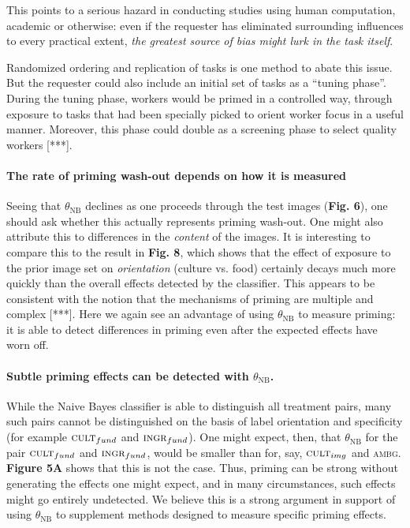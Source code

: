 \documentclass[a4paper]{report}
\begin{document}
This points to a serious hazard in conducting studies using human computation,
academic or otherwise: even if the requester has 
eliminated surrounding influences to every practical extent, 
\textit{the greatest source of bias might lurk in the task itself}.

Randomized ordering and replication of tasks is one method to abate this issue.
But the requester could also include an initial set of tasks as a 
``tuning phase''.  During the tuning phase, workers would be primed in a 
controlled way, through exposure to tasks that had been specially picked to
orient worker focus in a useful manner.  Moreover, this phase could double as a
screening phase to select quality workers [***].

\paragraph{The rate of priming wash-out depends on how it is measured}
Seeing that $\theta_\text{NB}$ declines as one proceeds through the test 
images (\textbf{Fig. 6}), one should ask whether this actually represents 
priming wash-out.  One might also attribute this to 
differences in the \textit{content} of the images. It is interesting to 
compare this to the result in \textbf{Fig. 8}, which
shows that the effect of exposure to the prior image set on 
\textit{orientation} (culture vs. food) certainly
decays much more quickly than the overall effects detected by
the classifier.  This appears to be consistent with the notion that the 
mechanisms of priming are multiple and complex [***].  Here we again see an
advantage of using $\theta_\text{NB}$ to measure priming: it is able to detect 
differences in priming even after the expected effects have worn off.

\paragraph{Subtle priming effects can be detected with $\theta_\text{NB}$.}
While the Naive Bayes classifier is able to distinguish all treatment pairs,
many such pairs cannot be distinguished on the basis of label orientation and 
specificity 
(for example $\textsc{cult}_{fund}$ and $\textsc{ingr}_{fund}$).
One might expect, then, that $\theta_\text{NB}$
for the pair $\textsc{cult}_{fund}$ and $\textsc{ingr}_{fund}$, would be 
smaller than for, say, $\textsc{cult}_{img}$ and \textsc{ambg}.  
\textbf{Figure 5A} shows that this is not the case.  Thus, priming can be 
strong without generating the effects one might expect, and in many 
circumstances, such effects might go entirely undetected.  We believe this 
is a strong argument in support of using $\theta_\text{NB}$ to supplement 
methods designed to measure specific priming effects.
\end{document}
